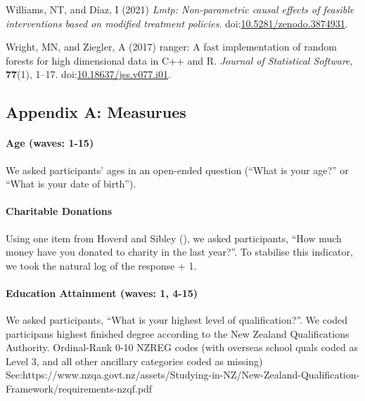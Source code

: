 \documentclass[
  singlecolumn]{article}
\let\oldparagraph\paragraph
\renewcommand{\paragraph}[1]{\oldparagraph{#1}\mbox{}}
\newlength{\cslhangindent}
\newenvironment{CSLReferences}[2] %
 {\begin{list}{}{%
  \setlength{\itemindent}{0pt}
  \setlength{\leftmargin}{0pt}
  \setlength{\parsep}{0pt}
  \ifodd #1
   \setlength{\leftmargin}{\cslhangindent}
   \setlength{\itemindent}{-1\cslhangindent}
  \fi
  \setlength{\itemsep}{#2\baselineskip}}}
 {\end{list}}
\begin{document}
\begin{CSLReferences}{1}{0}
Williams, NT, and Díaz, I (2021) \emph{Lmtp: Non-parametric causal
effects of feasible interventions based on modified treatment policies}.
doi:\href{https://doi.org/10.5281/zenodo.3874931}{10.5281/zenodo.3874931}.

Wright, MN, and Ziegler, A (2017) {ranger}: A fast implementation of
random forests for high dimensional data in {C++} and {R}. \emph{Journal
of Statistical Software}, \textbf{77}(1), 1--17.
doi:\href{https://doi.org/10.18637/jss.v077.i01}{10.18637/jss.v077.i01}.

\end{CSLReferences}

\newpage{}

\subsection{Appendix A: Measurues}\label{appendix-measures}

\paragraph{Age (waves: 1-15)}\label{age-waves-1-15}

We asked participants' ages in an open-ended question (``What is your
age?'' or ``What is your date of birth'').

\paragraph{Charitable Donations}\label{charitable-donations}

Using one item from Hoverd and Sibley
(), we asked participants,
``How much money have you donated to charity in the last year?''. To
stabilise this indicator, we took the natural log of the response + 1.

\paragraph{Education Attainment (waves: 1,
4-15)}\label{education-attainment-waves-1-4-15}

We asked participants, ``What is your highest level of qualification?''.
We coded participans highest finished degree according to the New
Zealand Qualifications Authority. Ordinal-Rank 0-10 NZREG codes (with
overseas school quals coded as Level 3, and all other ancillary
categories coded as missing)
See:https://www.nzqa.govt.nz/assets/Studying-in-NZ/New-Zealand-Qualification-Framework/requirements-nzqf.pdf
\end{document}
